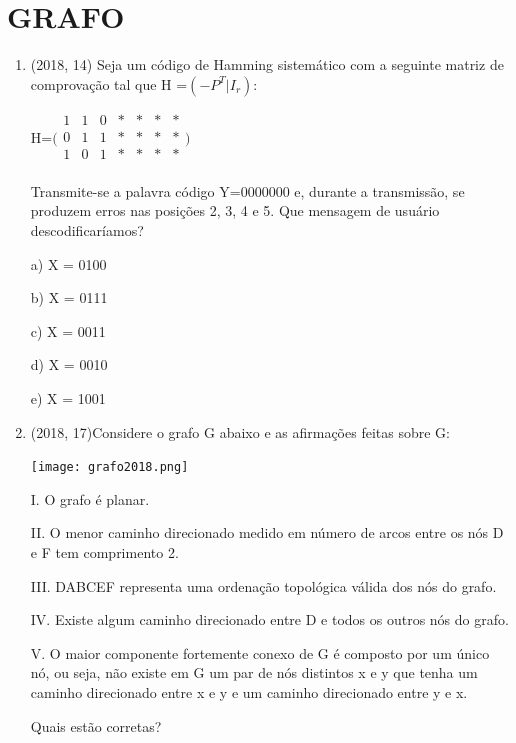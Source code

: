 \documentclass{article}
\begin{document}
\section{GRAFO}
\begin{enumerate}


\item (2018, 14) Seja um código de Hamming sistemático com a seguinte matriz de comprovação tal
que H =$(-P^T|I_r)$:\newline

H=$\Bigg(
    \begin{array}{ccccccc}
    1 & 1 & 0 & * & * & * & * \\
    0 & 1 & 1 & * & * & * & * \\
    1 & 0 & 1 & * & * & * & * \\
\end{array}\Bigg)$\newline

Transmite-se a palavra código Y=0000000 e, durante a transmissão, se produzem erros nas
posições 2, 3, 4 e 5. Que mensagem de usuário descodificaríamos?

a) X = 0100

b) X = 0111

c) X = 0011

d) X = 0010

e) X = 1001\newline



\item (2018, 17)Considere o grafo G abaixo e as afirmações feitas sobre G:

\texttt{[image: grafo2018.png]}\newline

I. O grafo é planar.

II. O menor caminho direcionado medido em número de arcos entre os nós D e F tem comprimento
2.

III. DABCEF representa uma ordenação topológica válida dos nós do grafo.

IV. Existe algum caminho direcionado entre D e todos os outros nós do grafo.

V. O maior componente fortemente conexo de G é composto por um único nó, ou seja, não existe
em G um par de nós distintos x e y que tenha um caminho direcionado entre x e y e um
caminho direcionado entre y e x.\newline

Quais estão corretas?\newline


\end{enumerate}
\end{document}
